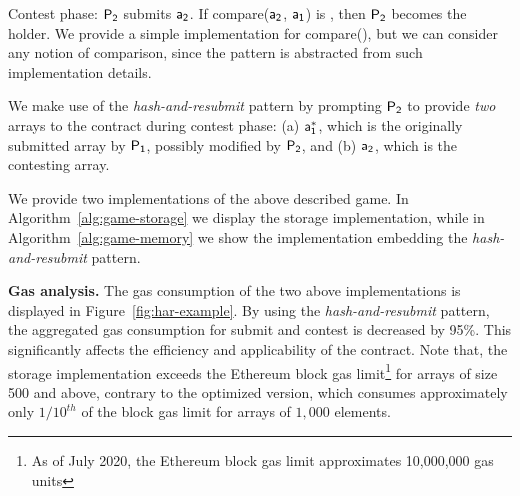 \noindent \textsf{Contest phase:} $\mathsf{P_2}$ submits $\mathsf{a_2}$. If
\textsf{compare}($\mathsf{a_2}$, $\mathsf{a_1}$) is \true, then $\mathsf{P_2}$ becomes the holder. We provide a simple implementation for \textsf{compare()},
but we can consider any notion of comparison, since the pattern is abstracted
from such implementation details.

We make use of the \emph{hash-and-resubmit} pattern by prompting $\mathsf{P_2}$ to
provide \emph{two} arrays to the contract during contest phase: (a) $\mathsf{a_1^*}$,
which is the originally submitted array by $\mathsf{P_1}$, possibly modified by $\mathsf{P_2}$,
and (b) $\mathsf{a_2}$, which is the contesting array.

We provide two implementations of the above described game.
In Algorithm~\ref{alg:game-storage} we display the storage implementation,
while in Algorithm~\ref{alg:game-memory} we show the implementation
embedding the \emph{hash-and-resubmit} pattern.



\noindent \textbf{Gas analysis.} The gas consumption of the two above
implementations is displayed in Figure~\ref{fig:har-example}. By using the
\emph{hash-and-resubmit} pattern, the aggregated gas consumption for
\textsf{submit} and \textsf{contest} is decreased by 95\%. This significantly
affects the efficiency and applicability of the contract. Note that, the
storage implementation exceeds the Ethereum block gas limit\footnote{As of July
2020, the Ethereum block gas limit approximates 10,000,000 gas units} for
arrays of size 500 and above, contrary to the optimized version, which consumes
approximately only $1/10^{th}$ of the block gas limit for arrays of $1{,}000$
elements.


